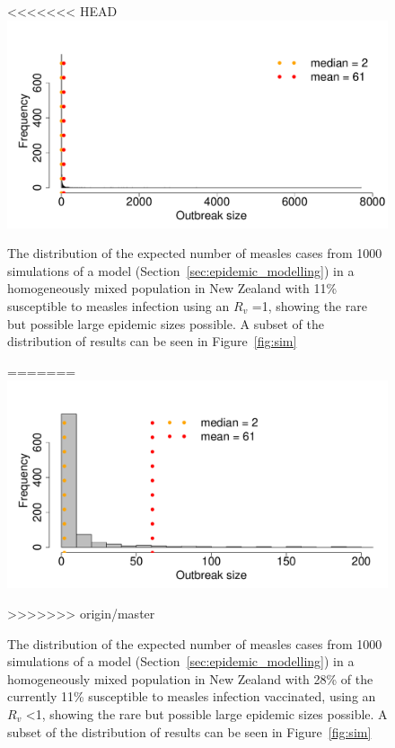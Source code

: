 \documentclass{article}
\begin{document}
\begin{itemize}
\begin{figure}
     \centering
<<<<<<< HEAD
\includegraphics{draftfinalreport-064}
     \caption{The distribution of the expected number of measles cases from 1000 simulations of a model (Section~\ref{sec:epidemic_modelling}) in a homogeneously mixed population in New Zealand with 11\% susceptible to measles infection using an $R_v$ =1, showing the rare but possible large epidemic sizes possible. A subset of the distribution of results can be seen in Figure~\ref{fig:sim}}
=======
\includegraphics{draftfinalreport-063}
     \caption{The distribution of the expected number of measles cases from 1000 simulations of a model (Section~\ref{sec:epidemic_modelling}) in a homogeneously mixed population in New Zealand with 28\% of the currently 11\% susceptible to measles infection vaccinated, using an $R_v$ <1, showing the rare but possible large epidemic sizes possible. A subset of the distribution of results can be seen in Figure~\ref{fig:sim}}
>>>>>>> origin/master
     \label{fig:sim1}
\end{figure}




\end{itemize}
\end{document}
